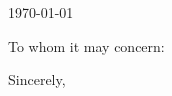 \documentclass[11pt, letterpaper]{letter} %
\begin{document}

\begin{letter}{
	\today\\	
}


\opening{To whom it may concern:}




\closing{Sincerely,}




\end{letter}
\end{document}

